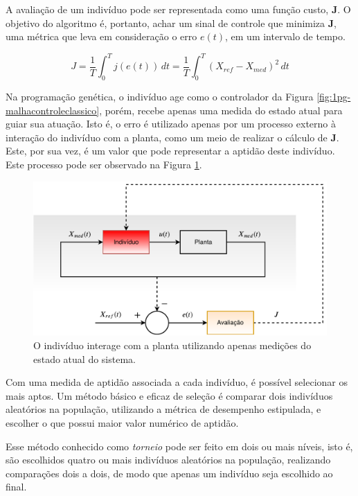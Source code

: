 A avaliação de um indivíduo pode ser representada como uma função custo, $\mathbf{J}$. O objetivo do algoritmo é, portanto, achar um sinal de controle que minimiza $\mathbf{J}$, uma métrica que leva em consideração o erro $e(t)$, em um intervalo de tempo.


\begin{equation}\label{eq:1pg-funcaoCusto}
J = \dfrac{1}{T}\int_0^{T}j(e(t))\,dt = \dfrac{1}{T}\int_0^T\left(X_{ref}-X_{med}\right)^2\,dt
\end{equation}

Na programação genética, o indivíduo age como o controlador da Figura \ref{fig:1pg-malhacontroleclassico}, porém, recebe apenas uma medida do estado atual para guiar sua atuação. Isto é, o erro é utilizado apenas por um processo externo à interação do indivíduo com a planta, como um meio de realizar o cálculo de $\mathbf{J}$. Este, por sua vez, é um valor que pode representar a aptidão deste indivíduo. Este processo pode ser observado na Figura \ref{fig:1pg-malhacontrolepg}.

\begin{figure}[H]
	\centering
	\includegraphics[width=0.85\linewidth]{02_desenvolvimento/01_Pg_Fig_MalhaControlePG.pdf}
	\caption{O indivíduo interage com a planta utilizando apenas medições do estado atual do sistema.}
	\label{fig:1pg-malhacontrolepg}
\end{figure}

Com uma medida de aptidão associada a cada indivíduo, é possível selecionar os mais aptos. Um método básico e eficaz de seleção é comparar dois indivíduos aleatórios na população, utilizando a métrica de desempenho estipulada, e escolher o que possui maior valor numérico de aptidão.

Esse método conhecido como \textit{torneio} pode ser feito em dois ou mais níveis, isto é, são escolhidos quatro ou mais indivíduos aleatórios na população, realizando comparações dois a dois, de modo que apenas um indivíduo seja escolhido ao final.

